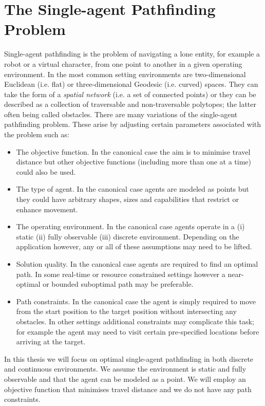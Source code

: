 \section{The Single-agent Pathfinding Problem}
\label{cha::lit::problem}
Single-agent pathfinding is the problem of navigating a lone entity, for example
a robot or a virtual character, from one point to another in a given operating 
environment.  In the most common setting environments are two-dimensional
Euclidean (i.e.  flat) or three-dimensional Geodesic (i.e.  curved) spaces. They
can take the form of a \emph{spatial network} (i.e. a set of connected points)
or they can be described as a collection of traversable and non-traversable
polytopes; the latter often being called obstacles.  There are many variations
of the single-agent pathfinding problem. These arise by adjusting certain
parameters associated with the problem such as:
\begin{itemize}
\item The objective function. In the canonical case the aim is to minimise
travel distance but other objective functions (including more than one at a
time) could also be used.
\item The type of agent. In the canonical case agents are modeled as points
but they could have arbitrary shapes, sizes and capabilities that 
restrict or enhance movement. %
\item The operating environment. In the canonical case agents operate in a 
(i) static (ii) fully observable (iii) discrete environment. 
Depending on the application however, any or all of these assumptions may need 
to be lifted.
\item Solution quality. In the canonical case agents are required to find 
an optimal path.
In some real-time or resource constrained settings however a near-optimal 
or bounded suboptimal path may be preferable.
\item Path constraints. In the canonical case  the agent is simply required 
to move from the start position to the target position without intersecting
any obstacles. In other settings additional constraints may complicate this
task; for example the agent may need to visit certain pre-specified locations 
before arriving at the target.
\end{itemize}


In this thesis we will focus on optimal single-agent pathfinding 
in both discrete and continuous environments. We assume the environment is
static and fully observable and that the agent can be modeled as a point.
We will employ an objective function that minimises travel distance and 
we do not have any path constraints.

